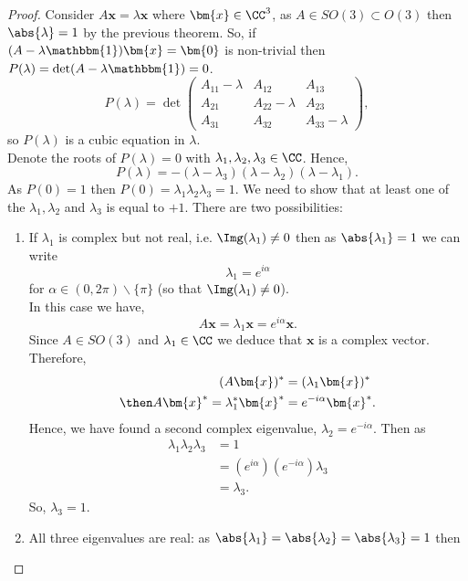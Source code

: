 \documentclass[12pt, a4paper]{article}
\begin{document}
\begin{proof}
    Consider \(A\bm{x}=\lambda\bm{x}\) where \(\bm{x} \in \CC^3\), as \(A\in SO(3) \subset O(3)\) then \(\abs{\lambda}=1\) by the previous theorem. So, if \((A-\lambda \mathbbm{1})\bm{x}=\bm{0} \) is non-trivial then \(P(\lambda)=\det(A-\lambda \mathbbm{1})=0\).
    \[P(\lambda)=\det\begin{pmatrix}
        A_{11} - \lambda & A_{12} & A_{13} \\
        A_{21} & A_{22}-\lambda & A_{23} \\
        A_{31} & A_{32} & A_{33} -\lambda
    \end{pmatrix},\]
    so \(P(\lambda)\) is a cubic equation in \(\lambda\). \\
    Denote the roots of \(P(\lambda) =0\) with \(\lambda_1,\lambda_2,\lambda_3 \in \CC\). Hence, 
    \[P(\lambda) = -(\lambda-\lambda_3)(\lambda-\lambda_2)(\lambda-\lambda_1).\]
    As \(P(0)=1\) then \(P(0)=\lambda_1\lambda_2\lambda_3 =1\). We need to show that at least one of the \(\lambda_1,\lambda_2\) and \(\lambda_3\) is equal to \(+1\).
    There are two possibilities:
    \begin{enumerate}
        \item If \(\lambda_1\) is complex but not real, i.e. \(\Img(\lambda_1) \neq 0\) then as \(\abs{\lambda_1}=1\) we can write 
        \[\lambda_1=e^{i\alpha}\]
        for \(\alpha \in (0,2\pi) \backslash \{\pi\}\) (so that \(\Img(\lambda_1)\neq 0\)).  \\ 
        In this case we have,
        \[A\bm{x}=\lambda_1 \bm{x}= e^{i\alpha} \bm{x}.\]
        Since \(A\in SO(3)\) and \(\lambda_1 \in \CC\) we deduce that \(\bm{x}\) is a complex vector. Therefore,
        \[\begin{aligned}
            (A\bm{x})^* &= (\lambda_1 \bm{x})^* \\
            \then A\bm{x}^* =\lambda_1^* \bm{x}^* &= e^{-i\alpha} \bm{x}^*.
        \end{aligned}\]
        Hence, we have found a second complex eigenvalue, \(\lambda_2 = e^{-i\alpha}\). Then as 
        \[\begin{aligned}
            \lambda_1\lambda_2\lambda_3 &=1 \\
            &=\left( e^{i\alpha} \right) \left( e^{-i\alpha} \right) \lambda_3 \\
            &= \lambda_3.
        \end{aligned}\]
        So, \(\lambda_3 =1\).
    \item All three eigenvalues are real: as \(\abs{\lambda_1}=\abs{\lambda_2}=\abs{\lambda_3}=1\) then 

\end{enumerate}
\end{proof}
\end{document}
